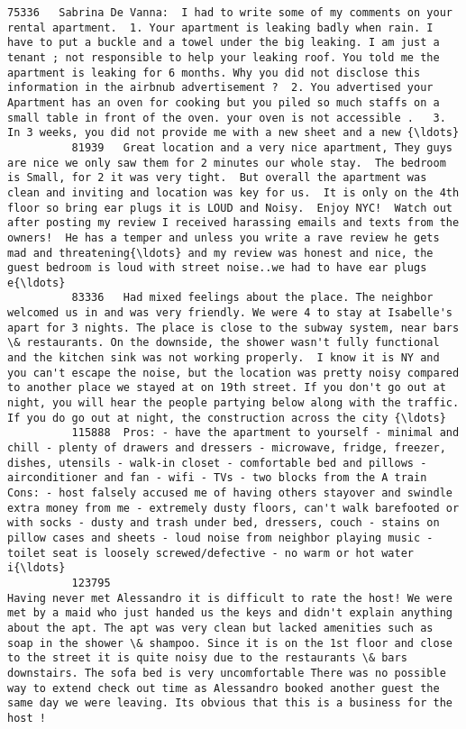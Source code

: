 \documentclass[11pt]{article}
\begin{document}
\begin{Verbatim}[commandchars=\\\{\}]
          75336   Sabrina De Vanna:  I had to write some of my comments on your rental apartment.  1. Your apartment is leaking badly when rain. I have to put a buckle and a towel under the big leaking. I am just a tenant ; not responsible to help your leaking roof. You told me the apartment is leaking for 6 months. Why you did not disclose this information in the airbnub advertisement ?  2. You advertised your Apartment has an oven for cooking but you piled so much staffs on a small table in front of the oven. your oven is not accessible .   3. In 3 weeks, you did not provide me with a new sheet and a new {\ldots}   
          81939   Great location and a very nice apartment, They guys are nice we only saw them for 2 minutes our whole stay.  The bedroom is Small, for 2 it was very tight.  But overall the apartment was clean and inviting and location was key for us.  It is only on the 4th floor so bring ear plugs it is LOUD and Noisy.  Enjoy NYC!  Watch out after posting my review I received harassing emails and texts from the owners!  He has a temper and unless you write a rave review he gets mad and threatening{\ldots} and my review was honest and nice, the guest bedroom is loud with street noise..we had to have ear plugs e{\ldots}   
          83336   Had mixed feelings about the place. The neighbor welcomed us in and was very friendly. We were 4 to stay at Isabelle's apart for 3 nights. The place is close to the subway system, near bars \& restaurants. On the downside, the shower wasn't fully functional and the kitchen sink was not working properly.  I know it is NY and you can't escape the noise, but the location was pretty noisy compared to another place we stayed at on 19th street. If you don't go out at night, you will hear the people partying below along with the traffic. If you do go out at night, the construction across the city {\ldots}   
          115888  Pros: - have the apartment to yourself - minimal and chill - plenty of drawers and dressers - microwave, fridge, freezer, dishes, utensils - walk-in closet - comfortable bed and pillows - airconditioner and fan - wifi - TVs - two blocks from the A train  Cons: - host falsely accused me of having others stayover and swindle extra money from me - extremely dusty floors, can't walk barefooted or with socks - dusty and trash under bed, dressers, couch - stains on pillow cases and sheets - loud noise from neighbor playing music - toilet seat is loosely screwed/defective - no warm or hot water i{\ldots}   
          123795                                                  Having never met Alessandro it is difficult to rate the host! We were met by a maid who just handed us the keys and didn't explain anything about the apt. The apt was very clean but lacked amenities such as soap in the shower \& shampoo. Since it is on the 1st floor and close to the street it is quite noisy due to the restaurants \& bars downstairs. The sofa bed is very uncomfortable There was no possible way to extend check out time as Alessandro booked another guest the same day we were leaving. Its obvious that this is a business for the host !   

\end{Verbatim}
\end{document}
